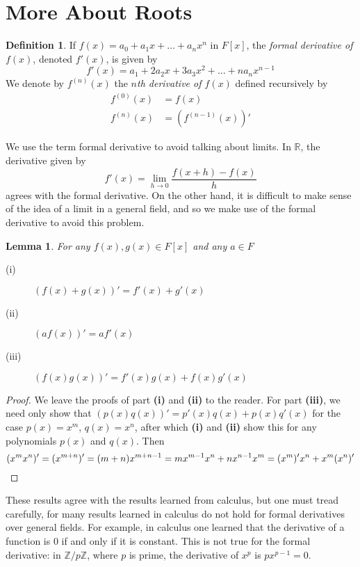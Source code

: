 \documentclass[12pt,leqno]{article}
\numberwithin{equation}{section}
\theoremstyle{plain}
\newtheorem{lem}[thm]{Lemma}
\theoremstyle{definition}
\newtheorem*{Def}{Definition}
\theoremstyle{remark}
\begin{document}
\section{More About Roots}
\begin{Def}
 If $f(x)=a_0+a_1x+\hdots+a_nx^n$ in $F[x]$, the \textit{formal derivative of $f(x)$}, denoted $f'(x)$, is given by \[f'(x)=a_1+2a_2x+3a_3x^2+\hdots+na_nx^{n-1}\] We denote by $f^{(n)}(x)$ the \textit{$n$th derivative of $f(x)$} defined recursively by \begin{align*}f^{(0)}(x)&=f(x)\\f^{(n)}(x)&=(f^{(n-1)}(x))'\end{align*}
\end{Def}

We use the term formal derivative to avoid talking about limits. In $\mathbb{R}$, the derivative given by \[f'(x)=\displaystyle\lim_{h\to0}\frac{f(x+h)-f(x)}{h}\] agrees with the formal derivative. On the other hand, it is difficult to make sense of the idea of a limit in a general field, and so we make use of the formal derivative to avoid this problem.

\begin{lem}For any $f(x),g(x)\in F[x]$ and any $a\in F$
\begin{description}
 \item [(i)] $(f(x)+g(x))'=f'(x)+g'(x)$
 \item [(ii)] $(af(x))'=af'(x)$
 \item [(iii)] $(f(x)g(x))'=f'(x)g(x)+f(x)g'(x)$
\end{description}
\end{lem}

\begin{proof}
 We leave the proofs of part \textbf{(i)} and \textbf{(ii)} to the reader. For part \textbf{(iii)}, we need only show that $(p(x)q(x))'=p'(x)q(x)+p(x)q'(x)$ for the case $p(x)=x^m$, $q(x)=x^n$, after which \textbf{(i)} and \textbf{(ii)} show this for any polynomials $p(x)$ and $q(x)$. Then \[(x^mx^n)'=(x^{m+n})'=(m+n)x^{m+n-1}=mx^{m-1}x^n+nx^{n-1}x^m=(x^m)'x^n+x^m(x^n)'\qedhere\]
\end{proof}

These results agree with the results learned from calculus, but one must tread carefully, for many results learned in calculus do not hold for formal derivatives over general fields. For example, in calculus one learned that the derivative of a function is 0 if and only if it is constant. This is not true for the formal derivative: in $\mathbb{Z}/p\mathbb{Z}$, where $p$ is prime, the derivative of $x^p$ is $px^{p-1}=0$.
\end{document}
